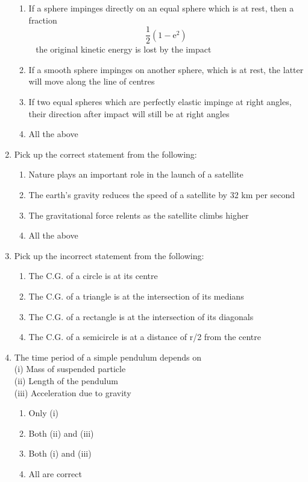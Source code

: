 \documentclass[11pt,a4paper]{article}
\begin{document}
\begin{enumerate}
\begin{enumerate}[label=\Alph*.]
\item{If a sphere impinges directly on an equal sphere which is at rest, then a fraction $$\frac{1}{2}\left( {1 - {{\text{e}}^2}} \right)$$ ~ the original kinetic energy is lost by the impact}
\item{If a smooth sphere impinges on another sphere, which is at rest, the latter will move along the line of centres}
\item{If two equal spheres which are perfectly elastic impinge at right angles, their direction after impact will still be at right angles}
\item{All the above}
\end{enumerate}
\item{Pick up the correct statement from the following:}
\begin{enumerate}[label=\Alph*.]
\item{Nature plays an important role in the launch of a satellite}
\item{The earth's gravity reduces the speed of a satellite by 32 km per second}
\item{The gravitational force relents as the satellite climbs higher}
\item{All the above}
\end{enumerate}
\item{Pick up the incorrect statement from the following:}
\begin{enumerate}[label=\Alph*.]
\item{The C.G. of a circle is at its centre}
\item{The C.G. of a triangle is at the intersection of its medians}
\item{The C.G. of a rectangle is at the intersection of its diagonals}
\item{The C.G. of a semicircle is at a distance of r/2 from the centre}
\end{enumerate}
\item{The time period of a simple pendulum depends on \\
 (i) Mass of suspended particle \\
 (ii) Length of the pendulum \\
 (iii) Acceleration due to gravity}
\begin{enumerate}[label=\Alph*.]
\item{Only (i)}
\item{Both (ii) and (iii)}
\item{Both (i) and (iii)}
\item{All are correct}

\end{enumerate}
\end{enumerate}
\end{document}
